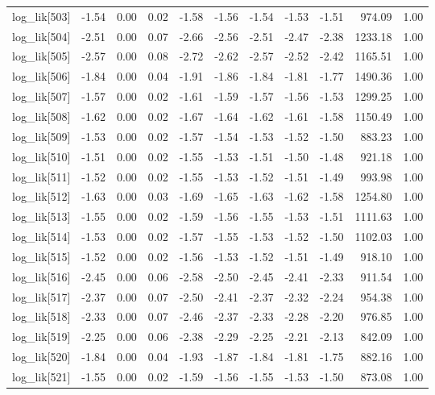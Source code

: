 \begin{table}[ht]
\begin{tabular}{rrrrrrrrrrr}
  log\_lik[503] & -1.54 & 0.00 & 0.02 & -1.58 & -1.56 & -1.54 & -1.53 & -1.51 & 974.09 & 1.00 \\ 
  log\_lik[504] & -2.51 & 0.00 & 0.07 & -2.66 & -2.56 & -2.51 & -2.47 & -2.38 & 1233.18 & 1.00 \\ 
  log\_lik[505] & -2.57 & 0.00 & 0.08 & -2.72 & -2.62 & -2.57 & -2.52 & -2.42 & 1165.51 & 1.00 \\ 
  log\_lik[506] & -1.84 & 0.00 & 0.04 & -1.91 & -1.86 & -1.84 & -1.81 & -1.77 & 1490.36 & 1.00 \\ 
  log\_lik[507] & -1.57 & 0.00 & 0.02 & -1.61 & -1.59 & -1.57 & -1.56 & -1.53 & 1299.25 & 1.00 \\ 
  log\_lik[508] & -1.62 & 0.00 & 0.02 & -1.67 & -1.64 & -1.62 & -1.61 & -1.58 & 1150.49 & 1.00 \\ 
  log\_lik[509] & -1.53 & 0.00 & 0.02 & -1.57 & -1.54 & -1.53 & -1.52 & -1.50 & 883.23 & 1.00 \\ 
  log\_lik[510] & -1.51 & 0.00 & 0.02 & -1.55 & -1.53 & -1.51 & -1.50 & -1.48 & 921.18 & 1.00 \\ 
  log\_lik[511] & -1.52 & 0.00 & 0.02 & -1.55 & -1.53 & -1.52 & -1.51 & -1.49 & 993.98 & 1.00 \\ 
  log\_lik[512] & -1.63 & 0.00 & 0.03 & -1.69 & -1.65 & -1.63 & -1.62 & -1.58 & 1254.80 & 1.00 \\ 
  log\_lik[513] & -1.55 & 0.00 & 0.02 & -1.59 & -1.56 & -1.55 & -1.53 & -1.51 & 1111.63 & 1.00 \\ 
  log\_lik[514] & -1.53 & 0.00 & 0.02 & -1.57 & -1.55 & -1.53 & -1.52 & -1.50 & 1102.03 & 1.00 \\ 
  log\_lik[515] & -1.52 & 0.00 & 0.02 & -1.56 & -1.53 & -1.52 & -1.51 & -1.49 & 918.10 & 1.00 \\ 
  log\_lik[516] & -2.45 & 0.00 & 0.06 & -2.58 & -2.50 & -2.45 & -2.41 & -2.33 & 911.54 & 1.00 \\ 
  log\_lik[517] & -2.37 & 0.00 & 0.07 & -2.50 & -2.41 & -2.37 & -2.32 & -2.24 & 954.38 & 1.00 \\ 
  log\_lik[518] & -2.33 & 0.00 & 0.07 & -2.46 & -2.37 & -2.33 & -2.28 & -2.20 & 976.85 & 1.00 \\ 
  log\_lik[519] & -2.25 & 0.00 & 0.06 & -2.38 & -2.29 & -2.25 & -2.21 & -2.13 & 842.09 & 1.00 \\ 
  log\_lik[520] & -1.84 & 0.00 & 0.04 & -1.93 & -1.87 & -1.84 & -1.81 & -1.75 & 882.16 & 1.00 \\ 
  log\_lik[521] & -1.55 & 0.00 & 0.02 & -1.59 & -1.56 & -1.55 & -1.53 & -1.50 & 873.08 & 1.00 \\ 

\end{tabular}
\end{table}
